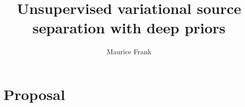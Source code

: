 \documentclass[nofonts, nobib]{tufte-book}
\title{Unsupervised variational source separation with deep priors}
\author{Maurice Frank}
\begin{document}
\frontmatter%
\maketitle%

\tableofcontents%
\listoftodos%
\clearpage

\mainmatter%
\chapter{Proposal}






\backmatter%

\printbibliography%
\end{document}
